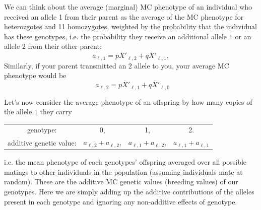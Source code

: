 We can think about the average
(marginal) MC
phenotype of an individual who received an allele 1 from their parent as the average of the MC phenotype for heterozgotes and 11 homozygotes, weighted by the probability that
the individual has these genotypes, i.e. the probability they receive an additional allele $1$ or an allele $2$ from their other parent:
\begin{equation} 
  a_{\ell, 1} = p\overline{X}'_{\ell,2}  + q\overline{X}'_{\ell,1}, \label{eqn:add_effect1}
\end{equation}
Similarly, if your parent transmitted an 2 allele to you, your average
MC phenotype would be
\begin{equation}
  ~~ a_{\ell, 2} = p\overline{X}'_{\ell,1}  + q\overline{X}'_{\ell,0} \label{eqn:add_effect2}
\end{equation}



Let's now consider the average phenotype of an offspring by how many
copies of the allele $1$ they carry
\begin{center}
\begin{tabular}{cccc}
genotype: & 0, & 1, & 2.\\
additive genetic value: & $a_{\ell,2}+ a_{\ell,2}$, & $a_{\ell,1}+a_{\ell,2}$, & $a_{\ell,1}+a_{\ell,1}$   \label{add_values}
\end{tabular}
\end{center}
%
i.e. the mean phenotype of each genotypes' offspring
averaged over all possible matings to other individuals in the
population (assuming individuals mate at random). These are the
additive MC genetic values (breeding values) of our genotypes. 
Here we are simply adding up the additive contributions of the alleles present
in each genotype and ignoring any non-additive effects of genotype.

